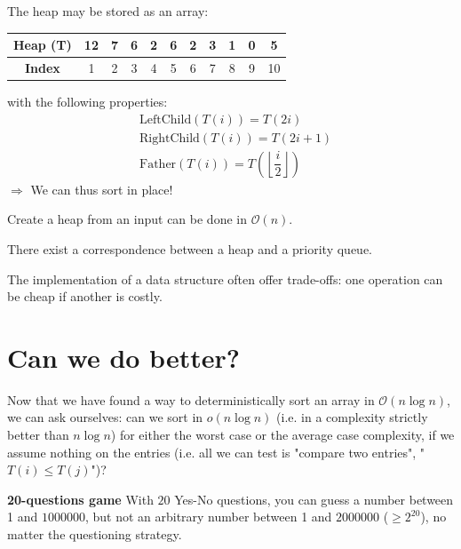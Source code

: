 \begin{remark} The heap may be stored as an array: \\
\begin{center}
\begin{tabular}{|c|c|c|c|c|c|c|c|c|c|c|}
   \hline
   \textbf{Heap (T)} & 12 & 7 & 6 & 2 & 6 & 2 & 3 & 1 & 0 & 5 \\
   \hline 
   \textbf{Index} & 1 & 2 & 3 & 4 & 5 & 6 & 7 & 8 & 9 & 10 \\
   \hline
\end{tabular}
\end{center} 
\vspace*{0.4 cm} 
with the following properties:
\begin{align*}
& \text{LeftChild}(T(i)) = T(2i) \\
& \text{RightChild}(T(i)) = T(2i+1) \\
& \text{Father}(T(i)) = T\left( \left\lfloor\dfrac{i}{2}\right\rfloor \right)
\end{align*}
$\Rightarrow $ We can thus sort in place!
\end{remark}
\begin{remark} Create a heap from an input can be done in $\mathcal{O}(n)$.
\end{remark}
\begin{remark} There exist a correspondence between a heap and a priority queue.
\end{remark}
\begin{remark} The implementation of a data structure often offer trade-offs: one operation can be cheap if another is costly. 
\end{remark}

\section{Can we do better?}

Now that we have found a way to deterministically sort an array in $\mathcal{O}(n\log n)$, we can ask ourselves: can we sort in $o(n \log n)$ (i.e. in a complexity strictly better than $n \log n$) for either the worst case or the average case complexity, if we assume nothing on the entries (i.e. all we can test is "compare two entries", "$T(i) \leq T(j)$")?\\

\begin{example}
\begin{leftbar}
\textbf{20-questions game} With $20$ Yes-No questions, you can guess a number between 1 and $1000000$, but not an arbitrary number between 1 and $2000000$ ($\geq 2^{20}$), no matter the questioning strategy.
\end{leftbar}
\end{example}

